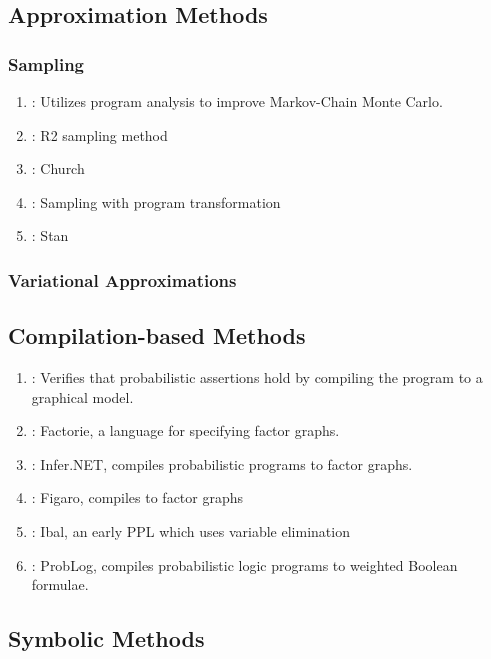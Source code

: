 \documentclass{article}
\begin{document}
\subsection{Approximation Methods}

\subsubsection{Sampling}

\begin{enumerate}
\item \citep{Hur2015}: Utilizes program analysis to improve Markov-Chain Monte Carlo.
\item \citep{nori2014r2}: R2 sampling method
\item \citep{goodman2012church}: Church
\item \citep{wingate2011lightweight}: Sampling with program transformation
\item \citep{carpenter2017stan}: Stan
\end{enumerate}

\subsubsection{Variational Approximations}

\subsection{Compilation-based Methods}

\begin{enumerate}
\item \citep{Sampson2014}: Verifies that probabilistic assertions hold by
  compiling the program to a graphical model.
\item \citep{McCallum2009}: Factorie, a language for specifying factor graphs.
\item \citep{InferNET14}: Infer.NET, compiles probabilistic programs to factor
  graphs.
\item \citep{pfeffer2009figaro}: Figaro, compiles to factor graphs
\item \citep{pfeffer2001ibal}: Ibal, an early PPL which uses variable elimination
\item \citep{Fierens2013}: ProbLog, compiles probabilistic logic programs to
  weighted Boolean formulae.
\end{enumerate}

\subsection{Symbolic Methods}
\end{document}
